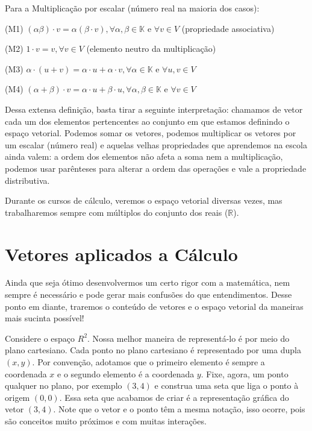 \documentclass[
  letterpaper,
  DIV=11,
  numbers=noendperiod]{scrreprt}
\begin{document}
Para a Multiplicação por escalar (número real na maioria dos casos):

(M1)
\((\alpha \beta) \cdot v = \alpha (\beta \cdot v), \forall \alpha , \beta \in \mathbb{K} \text{ e } \forall  v \in V\)
(propriedade associativa)

(M2) \(1 \cdot v = v,  \forall v \in V\) (elemento neutro da
multiplicação)

(M3)
\(\alpha \cdot (u+v)=\alpha \cdot u + \alpha \cdot v,  \forall \alpha \in \mathbb{K} \text{ e } \forall u,v \in V\)

(M4)
\((\alpha + \beta) \cdot v = \alpha \cdot u + \beta \cdot u, \forall \alpha, \beta \in \mathbb{K} \text{ e } \forall v \in V\)

Dessa extensa definição, basta tirar a seguinte interpretação: chamamos
de vetor cada um dos elementos pertencentes ao conjunto em que estamos
definindo o espaço vetorial. Podemos somar os vetores, podemos
multiplicar os vetores por um escalar (número real) e aquelas velhas
propriedades que aprendemos na escola ainda valem: a ordem dos elementos
não afeta a soma nem a multiplicação, podemos usar parênteses para
alterar a ordem das operações e vale a propriedade distributiva.

Durante os cursos de cálculo, veremos o espaço vetorial diversas vezes,
mas trabalharemos sempre com múltiplos do conjunto dos reais
(\(\mathbb{R}\)).

\section{Vetores aplicados a
Cálculo}\label{vetores-aplicados-a-cuxe1lculo}

Ainda que seja ótimo desenvolvermos um certo rigor com a matemática, nem
sempre é necessário e pode gerar mais confusões do que entendimentos.
Desse ponto em diante, traremos o conteúdo de vetores e o espaço
vetorial da maneiras mais sucinta possível!

Considere o espaço \(R^2\). Nossa melhor maneira de representá-lo é por
meio do plano cartesiano. Cada ponto no plano cartesiano é representado
por uma dupla \((x, y)\). Por convenção, adotamos que o primeiro
elemento é sempre a coordenada \(x\) e o segundo elemento é a coordenada
\(y\). Fixe, agora, um ponto qualquer no plano, por exemplo \((3,4)\) e
construa uma seta que liga o ponto à origem \((0,0)\). Essa seta que
acabamos de criar é a representação gráfica do vetor \((3,4)\). Note que
o vetor e o ponto têm a mesma notação, isso ocorre, pois são conceitos
muito próximos e com muitas interações.
\end{document}
